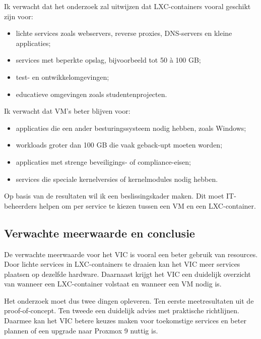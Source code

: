 Ik verwacht dat het onderzoek zal uitwijzen dat LXC-containers vooral geschikt zijn voor:

\begin{itemize}
    \item lichte services zoals webservers, reverse proxies, DNS-servers en kleine applicaties;
    \item services met beperkte opslag, bijvoorbeeld tot 50 à 100 GB;
    \item test- en ontwikkelomgevingen;
    \item educatieve omgevingen zoals studentenprojecten.
\end{itemize}

Ik verwacht dat VM's beter blijven voor:

\begin{itemize}
    \item applicaties die een ander besturingssysteem nodig hebben, zoals Windows;
    \item workloads groter dan 100 GB die vaak geback-upt moeten worden;
    \item applicaties met strenge beveiligings- of compliance-eisen;
    \item services die speciale kernelversies of kernelmodules nodig hebben.
\end{itemize}

Op basis van de resultaten wil ik een beslissingskader maken. Dit moet IT-beheerders helpen om per service te kiezen tussen een VM en een LXC-container.

\subsection{Verwachte meerwaarde en conclusie}

De verwachte meerwaarde voor het VIC is vooral een beter gebruik van resources. Door lichte services in LXC-containers te draaien kan het VIC meer services plaatsen op dezelfde hardware. Daarnaast krijgt het VIC een duidelijk overzicht van wanneer een LXC-container volstaat en wanneer een VM nodig is. 

Het onderzoek moet dus twee dingen opleveren. Ten eerste meetresultaten uit de proof-of-concept. Ten tweede een duidelijk advies met praktische richtlijnen. Daarmee kan het VIC betere keuzes maken voor toekomstige services en beter plannen of een upgrade naar Proxmox 9 nuttig is.



